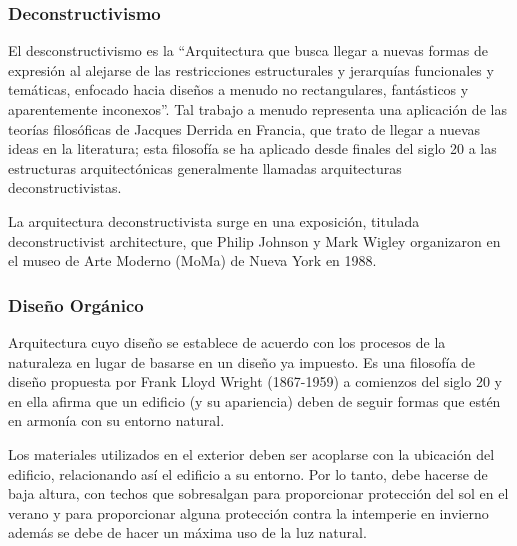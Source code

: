 \subsubsection{Deconstructivismo}
El desconstructivismo es la “Arquitectura que busca llegar a nuevas formas de expresión al alejarse de las restricciones estructurales y jerarquías funcionales y temáticas, enfocado 
hacia diseños a menudo no rectangulares, fantásticos y aparentemente inconexos”\cite{B24}. Tal trabajo a menudo representa una aplicación de las teorías filosóficas  de Jacques Derrida en Francia, que trato de llegar a nuevas ideas en la literatura; esta filosofía se ha aplicado desde finales del siglo 20 a las estructuras arquitectónicas generalmente llamadas arquitecturas deconstructivistas. \par
La arquitectura deconstructivista surge en una exposición, titulada deconstructivist architecture, que Philip Johnson y Mark Wigley organizaron en el museo de Arte Moderno (MoMa) de Nueva York en 1988.

\subsubsection{Diseño Orgánico}
Arquitectura cuyo diseño se establece de acuerdo con los procesos de la naturaleza en lugar de basarse en un diseño ya impuesto. Es una filosofía de diseño propuesta por Frank Lloyd Wright (1867-1959) a comienzos del siglo 20 y en ella afirma que un edificio (y su apariencia) deben de seguir formas que estén en armonía con su entorno natural.\cite{B24}\par  
Los materiales utilizados en el exterior deben ser acoplarse  con la ubicación del edificio, relacionando así el edificio a su entorno. Por lo tanto, debe hacerse de baja altura, con techos que sobresalgan para proporcionar protección del sol en el verano y para proporcionar alguna protección contra la intemperie en invierno además se debe de hacer un máxima uso de la luz natural.

